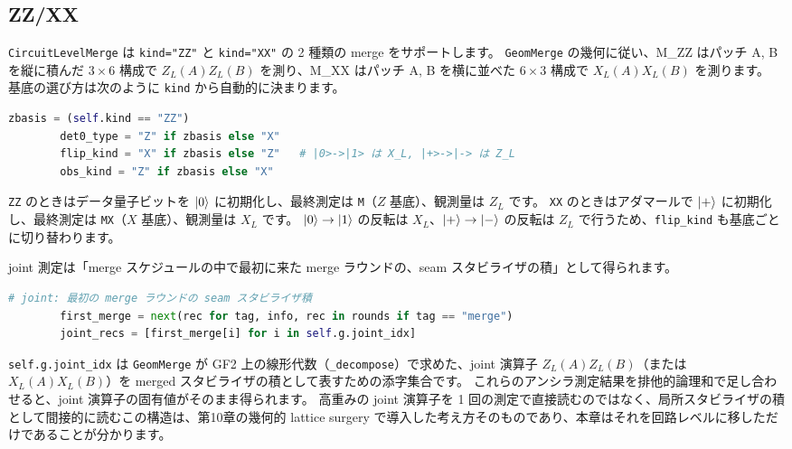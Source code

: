 \subsection{ZZ/XX}

\texttt{CircuitLevelMerge} は \texttt{kind="ZZ"} と \texttt{kind="XX"} の 2 種類の merge をサポートします。
\texttt{GeomMerge} の幾何に従い、M\_ZZ はパッチ A, B を縦に積んだ $3\times6$ 構成で $Z_L(A)Z_L(B)$ を測り、M\_XX はパッチ A, B を横に並べた $6\times3$ 構成で $X_L(A)X_L(B)$ を測ります。
基底の選び方は次のように \texttt{kind} から自動的に決まります。

\begin{lstlisting}[language=Python, caption={基底の対応（\codepath{src/stages/02_circuit_level/src/ftqc/circuit_level_merge.py}）}]
        zbasis = (self.kind == "ZZ")
        det0_type = "Z" if zbasis else "X"
        flip_kind = "X" if zbasis else "Z"   # |0>->|1> は X_L, |+>->|-> は Z_L
        obs_kind = "Z" if zbasis else "X"
\end{lstlisting}

\texttt{ZZ} のときはデータ量子ビットを $\ket{0}$ に初期化し、最終測定は \texttt{M}（$Z$ 基底）、観測量は $Z_L$ です。
\texttt{XX} のときはアダマールで $\ket{+}$ に初期化し、最終測定は \texttt{MX}（$X$ 基底）、観測量は $X_L$ です。
$\ket{0}\to\ket{1}$ の反転は $X_L$、$\ket{+}\to\ket{-}$ の反転は $Z_L$ で行うため、\texttt{flip\_kind} も基底ごとに切り替わります。

joint 測定は「merge スケジュールの中で最初に来た merge ラウンドの、seam スタビライザの積」として得られます。

\begin{lstlisting}[language=Python, caption={joint 測定記録の抽出（\codepath{src/stages/02_circuit_level/src/ftqc/circuit_level_merge.py}）}]
        # joint: 最初の merge ラウンドの seam スタビライザ積
        first_merge = next(rec for tag, info, rec in rounds if tag == "merge")
        joint_recs = [first_merge[i] for i in self.g.joint_idx]
\end{lstlisting}

\texttt{self.g.joint\_idx} は \texttt{GeomMerge} が GF2 上の線形代数（\texttt{\_decompose}）で求めた、joint 演算子 $Z_L(A)Z_L(B)$（または $X_L(A)X_L(B)$）を merged スタビライザの積として表すための添字集合です。
これらのアンシラ測定結果を排他的論理和で足し合わせると、joint 演算子の固有値がそのまま得られます。
高重みの joint 演算子を 1 回の測定で直接読むのではなく、局所スタビライザの積として間接的に読むこの構造は、第10章の幾何的 lattice surgery で導入した考え方そのものであり、本章はそれを回路レベルに移しただけであることが分かります。

